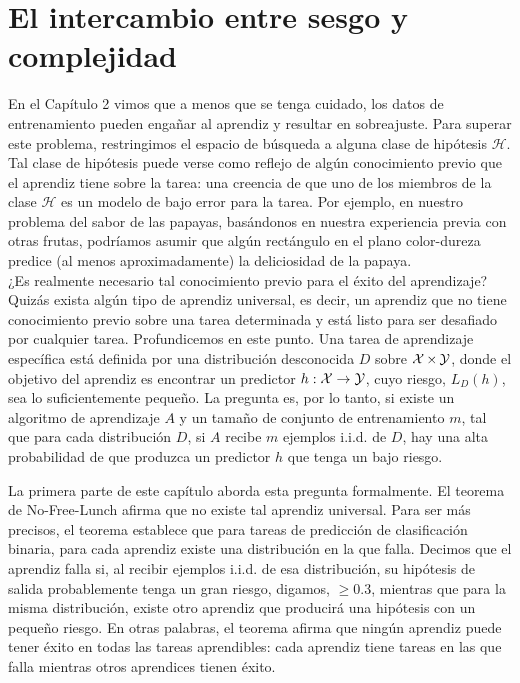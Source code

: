 \chapter{El intercambio entre sesgo y complejidad}
En el Capítulo 2 vimos que a menos que se tenga cuidado, los datos de entrenamiento pueden engañar al aprendiz y resultar en sobreajuste. Para superar este problema, restringimos el espacio de búsqueda a alguna clase de hipótesis $\mathcal{H}$. Tal clase de hipótesis puede verse como reflejo de algún conocimiento previo que el aprendiz tiene sobre la tarea: una creencia de que uno de los miembros de la clase $\mathcal{H}$ es un modelo de bajo error para la tarea. Por ejemplo, en nuestro problema del sabor de las papayas, basándonos en nuestra experiencia previa con otras frutas, podríamos asumir que algún rectángulo en el plano color-dureza predice (al menos aproximadamente) la deliciosidad de la papaya.\\

¿Es realmente necesario tal conocimiento previo para el éxito del aprendizaje? Quizás exista algún tipo de aprendiz universal, es decir, un aprendiz que no tiene conocimiento previo sobre una tarea determinada y está listo para ser desafiado por cualquier tarea. Profundicemos en este punto. Una tarea de aprendizaje específica está definida por una distribución desconocida $D$ sobre $\mathop{\mbox{$\mathcal{X}$}}\nolimits \times \mathop{\mbox{$\mathcal{Y}$}}\nolimits$, donde el objetivo del aprendiz es encontrar un predictor $h: \mathop{\mbox{$\mathcal{X}$}}\nolimits \rightarrow \mathop{\mbox{$\mathcal{Y}$}}\nolimits$, cuyo riesgo, $L_D(h)$, sea lo suficientemente pequeño. La pregunta es, por lo tanto, si existe un algoritmo de aprendizaje $A$ y un tamaño de conjunto de entrenamiento $m$, tal que para cada distribución $D$, si $A$ recibe $m$ ejemplos i.i.d. de $D$, hay una alta probabilidad de que produzca un predictor $h$ que tenga un bajo riesgo.

La primera parte de este capítulo aborda esta pregunta formalmente. El teorema de No-Free-Lunch afirma que no existe tal aprendiz universal. Para ser más precisos, el teorema establece que para tareas de predicción de clasificación binaria, para cada aprendiz existe una distribución en la que falla. Decimos que el aprendiz falla si, al recibir ejemplos i.i.d. de esa distribución, su hipótesis de salida probablemente tenga un gran riesgo, digamos, $\geq 0.3$, mientras que para la misma distribución, existe otro aprendiz que producirá una hipótesis con un pequeño riesgo. En otras palabras, el teorema afirma que ningún aprendiz puede tener éxito en todas las tareas aprendibles: cada aprendiz tiene tareas en las que falla mientras otros aprendices tienen éxito.

